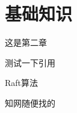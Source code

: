 \section{基础知识}
\setcounter{section}{2}
\setcounter{subsection}{0}
\setcounter{table}{0}
\setcounter{figure}{0}
\setcounter{equation}{0}
\setcounter{definition}{0}

这是第二章

测试一下引用

Raft算法\cite{ongaro2014search, ongaro2014raft}

知网随便找的\cite{TLAA202502013}

\newpage
